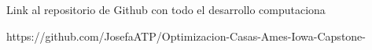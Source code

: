 Link al repositorio de Github con todo el desarrollo computaciona

https://github.com/JosefaATP/Optimizacion-Casas-Ames-Iowa-Capstone-
